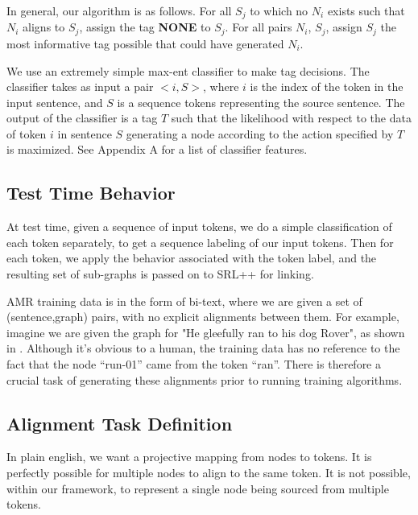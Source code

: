 \documentclass[11pt]{article}
\begin{document}
In general, our algorithm is as follows. For all $S_j$ to which no $N_i$ exists such that $N_i$ aligns to $S_j$, assign the tag \textbf{NONE} to $S_j$. For all pairs $N_i$, $S_j$, assign $S_j$ the most informative tag possible that could have generated $N_i$. 


We use an extremely simple max-ent classifier to make tag decisions. The classifier takes as input a pair $< i, S >$, where $i$ is the index of the token in the input sentence, and $S$ is a sequence tokens representing the source sentence. The output of the classifier is a tag $T$ such that the likelihood with respect to the data of token $i$ in sentence $S$ generating a node according to the action specified by $T$ is maximized. See Appendix A for a list of classifier features.

\subsection{Test Time Behavior}

At test time, given a sequence of input tokens, we do a simple classification of each token separately, to get a sequence labeling of our input tokens. Then for each token, we apply the behavior associated with the token label, and the resulting set of sub-graphs is passed on to SRL++ for linking.


AMR training data is in the form of bi-text, where we are given a set of (sentence,graph) pairs, with no explicit alignments between them. For example, imagine we are given the graph for "He gleefully ran to his dog Rover", as shown in . Although it's obvious to a human, the training data has no reference to the fact that the node ``run-01'' came from the token ``ran''. There is therefore a crucial task of generating these alignments prior to running training algorithms.

\subsection{Alignment Task Definition}

In plain english, we want a projective mapping from nodes to tokens. It is perfectly possible for multiple nodes to align to the same token. It is not possible, within our framework, to represent a single node being sourced from multiple tokens.
\end{document}
